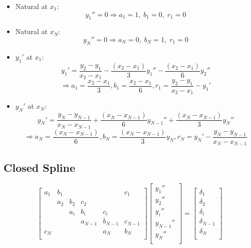 \documentclass[aps,onecolumn,11pt]{revtex4}
\begin{document}
\begin{itemize}
\item Natural at $x_1$:
\begin{equation}
	y_1'' = 0 \Rightarrow a_1=1,\;b_1=0,\;r_1=0
\end{equation}
\item Natural at $x_N$:
\begin{equation}
	y_N'' = 0 \Rightarrow a_N=0,\;b_N=1,\;r_1=0
\end{equation}

\item $y_1'$ at $x_1$:
\begin{equation}
	y_1' = \dfrac{y_2-y_1}{x_2-x_1} - \dfrac{(x_{2} - x_1)}{3} y_1'' - \dfrac{(x_{2} - x_1)}{6} y_{2}''
\end{equation}
$$
	\Rightarrow a_1=\dfrac{x_2-x_1}{3}, b_1=\dfrac{x_2-x_1}{6}, r_1 = \dfrac{y_2-y_1}{x_2-x_1} - y_1'
$$

\item $y_N'$ at $x_N$:
\begin{equation}
	y_N' = \dfrac{y_{N}-y_{N-1}}{x_{N}-x_{N-1}} + \dfrac{(x_{N} - x_{N-1})}{6} y_{N-1}'' + \dfrac{(x_{N} - x_{N-1})}{3} y_{N}''
\end{equation}
$$
	\Rightarrow a_N= \dfrac{(x_{N} - x_{N-1})}{6} , b_N = \dfrac{(x_{N} - x_{N-1})}{3} y_{N}, r_N = y_N' - \dfrac{y_{N}-y_{N-1}}{x_{N}-x_{N-1}}
$$
\end{itemize}

\subsection{Closed Spline}

	\begin{equation}
\begin{bmatrix}
a_1  & b_1 &     &         &         &  c_1    \\
     & a_2 & b_2 & c_2     &         &         \\
     &     & a_i & b_i     & c_i     &         \\
     &     &     & a_{N-1} & b_{N-1} & c_{N-1} \\
 c_N &     &     &         &   a_N   & b_N     \\
\end{bmatrix}
\begin{bmatrix}
	y_1''\\
	y_2''\\
	y_i''\\
	y_{N-1}''\\
	y_N''\\
\end{bmatrix}
 = 
 \begin{bmatrix}
 	\delta_1\\
	\delta_2\\
	\delta_i\\
	\delta_{N-1}\\
	\delta_N\\
 \end{bmatrix}
\end{equation}
	
\end{document}
